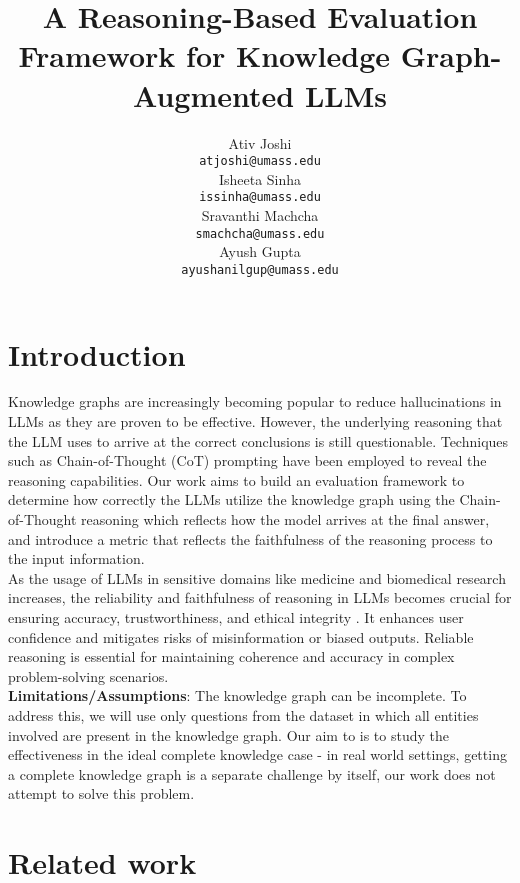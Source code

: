 \documentclass[11pt,a4paper]{article}
\title{A Reasoning-Based Evaluation Framework for Knowledge Graph-Augmented LLMs}
\author{Ativ Joshi \\
  {\tt atjoshi@umass.edu} \\\And
  Isheeta Sinha \\
  {\tt issinha@umass.edu} \\\AND
  Sravanthi Machcha \\
  {\tt smachcha@umass.edu} \\\And
  Ayush Gupta \\
  {\tt ayushanilgup@umass.edu} \\}
\begin{document}
\maketitle

\section{Introduction}
Knowledge graphs are increasingly becoming popular to reduce hallucinations in LLMs as they are proven to be effective. However, the underlying reasoning that the LLM uses to arrive at the correct conclusions is still questionable. Techniques such as Chain-of-Thought (CoT) prompting \cite{wei2023chainofthoughtpromptingelicitsreasoning} have been employed to reveal the reasoning capabilities. Our work aims to build an evaluation framework to determine how correctly the LLMs utilize the knowledge graph using the Chain-of-Thought reasoning which reflects how the model arrives at the final answer, and introduce a metric that reflects the faithfulness of the reasoning process to the input information.\\

\noindent As the usage of LLMs in sensitive domains like medicine and biomedical research increases, the reliability and faithfulness of reasoning in LLMs becomes crucial for ensuring accuracy, trustworthiness, and ethical integrity \cite{agarwal2024faithfulnessvsplausibilityunreliability}. It enhances user confidence and mitigates risks of misinformation or biased outputs. Reliable reasoning is essential for maintaining coherence and accuracy in complex problem-solving scenarios.\\

\noindent \textbf{Limitations/Assumptions}:
The knowledge graph can be incomplete. To address this, we will use only questions from the dataset in which all entities involved are present in the knowledge graph. Our aim to is to study the effectiveness in the ideal complete knowledge case - in real world settings, getting a complete knowledge graph is a separate challenge by itself, our work does not attempt to solve this problem.


\section{Related work}
\end{document}
